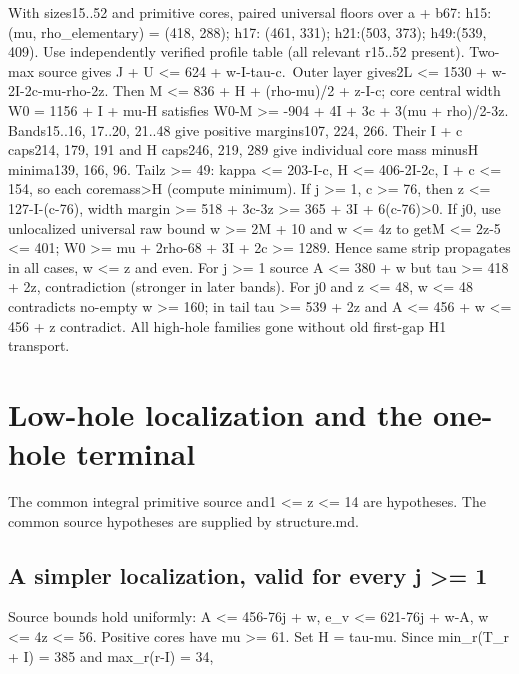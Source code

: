\documentclass[11pt,a4paper]{article}
\begin{document}
With sizes15..52 and primitive cores, paired universal floors over a +
b67: h15: (mu, rho\_elementary) = (418, 288); h17: (461, 331); h21:(503,
373); h49:(539, 409). Use independently verified profile table (all
relevant r15..52 present). Two-max source gives J + U \textless= 624 +
w-I-tau-c.~Outer layer gives2L \textless= 1530 + w-2I-2c-mu-rho-2z. Then
M \textless= 836 + H + (rho-mu)/2 + z-I-c; core central width W0 = 1156
+ I + mu-H satisfies W0-M \textgreater= -904 + 4I + 3c + 3(mu +
rho)/2-3z. Bands15..16, 17..20, 21..48 give positive margins107, 224,
266. Their I + c caps214, 179, 191 and H caps246, 219, 289 give
individual core mass minusH minima139, 166, 96. Tailz \textgreater= 49:
kappa \textless= 203-I-c, H \textless= 406-2I-2c, I + c \textless= 154,
so each coremass\textgreater H (compute minimum). If j \textgreater= 1,
c \textgreater= 76, then z \textless= 127-I-(c-76), width margin
\textgreater= 518 + 3c-3z \textgreater= 365 + 3I + 6(c-76)\textgreater0.
If j0, use unlocalized universal raw bound w \textgreater= 2M + 10 and w
\textless= 4z to getM \textless= 2z-5 \textless= 401; W0 \textgreater=
mu + 2rho-68 + 3I + 2c \textgreater= 1289. Hence same strip propagates
in all cases, w \textless= z and even. For j \textgreater= 1 source A
\textless= 380 + w but tau \textgreater= 418 + 2z, contradiction
(stronger in later bands). For j0 and z \textless= 48, w \textless= 48
contradicts no-empty w \textgreater= 160; in tail tau \textgreater= 539
+ 2z and A \textless= 456 + w \textless= 456 + z contradict. All
high-hole families gone without old first-gap H1 transport.

\clearpage
\hypertarget{low-hole-localization-and-the-one-hole-terminal}{%
\section{Low-hole localization and the one-hole
terminal}\label{low-hole-localization-and-the-one-hole-terminal}}

The common integral primitive source and1 \textless= z \textless= 14 are
hypotheses. The common source hypotheses are supplied by structure.md.

\hypertarget{a-simpler-localization-valid-for-every-j-1}{%
\subsection{A simpler localization, valid for every j \textgreater=
1}\label{a-simpler-localization-valid-for-every-j-1}}

Source bounds hold uniformly: A \textless= 456-76j + w, e\_v \textless=
621-76j + w-A, w \textless= 4z \textless= 56. Positive cores have mu
\textgreater= 61. Set H = tau-mu. Since min\_r(T\_r + I) = 385 and
max\_r(r-I) = 34,
\end{document}
